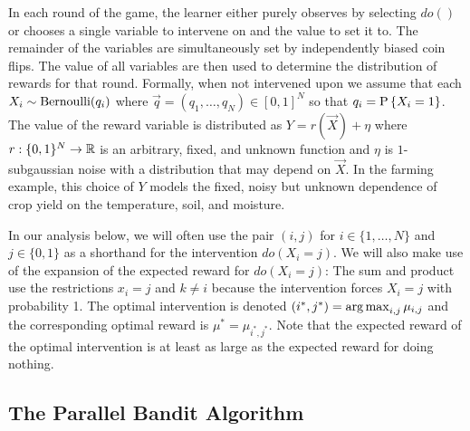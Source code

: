In each round of the game, the learner either purely observes by selecting $do()$ or chooses a single variable to intervene on and the value to set it to. 
The remainder of the variables are simultaneously set by independently biased coin flips. 
The value of all variables are then used to determine the distribution of rewards for that round.
Formally, when not intervened upon we assume that each $X_i \sim \bernoulli(q_i)$ where $\vec{q} = (q_1, \ldots, q_N) \in [0,1]^N$ so that $q_i = \P{X_i = 1}$.
The value of the reward variable is distributed as $Y = r(\vec{X}) + \eta$ where $r : \{0,1\}^N \to \R$ is an arbitrary, fixed, and unknown function and $\eta$ is $1$-subgaussian noise with a distribution that may depend on $\vec{X}$.
In the farming example, this choice of $Y$ models the fixed, noisy but unknown dependence of crop yield on the temperature, soil, and moisture.

In our analysis below, we will often use the pair $(i,j)$ for $i \in \{1, \ldots, N\}$ and $j \in \{0,1\}$ as a shorthand for the intervention $do(X_i = j)$.
We will also make use of the expansion of the expected reward for $do(X_i = j)$:
The sum and product use the restrictions $x_i = j$ and $k \ne i$ because the intervention forces $X_i = j$ with probability 1.
The optimal intervention is denoted $(i^*,j^*) = \argmax_{i,j} \mu_{i,j}$ and the corresponding optimal reward is $\mu^* = \mu_{i^*,j^*}$. 
Note that the expected reward of the optimal intervention is at least as large as the expected reward for doing nothing.



\subsection{The Parallel Bandit Algorithm}
\label{sub:par-bandit-alg}

